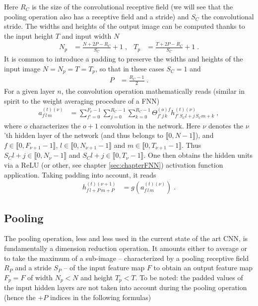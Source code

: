 Here $R_C$ is the size of the convolutional receptive field (we will see that the pooling operation also has a receptive field and a stride) and $S_C$ the convolutional stride. The widths and heights of the output image can be computed thanks to the input height $T$ and input width $N$
\begin{align}
N_p&=\frac{N+2P-R_C}{S_C}+1 \;,&
%
T_p&=\frac{T+2P-R_C}{S_C}+1\;.
\end{align}
It is common to introduce a padding to preserve the widths and heights of the input image $N=N_p=T=T_p$, so that in these cases $S_C=1$ and
\begin{align}
P&=\frac{R_C-1}{2}\;.
\end{align}
For a given layer $n$, the convolution operation mathematically reads (similar in spirit to the weight averaging procedure of a FNN)
\begin{align}
a_{f\,l\,m}^{(t)(\nu)}&=\sum^{F_\nu-1}_{f'=0}\sum^{R_C-1}_{j=0}\sum^{R_C-1}_{k=0}
%
\Theta^{(o)f}_{f'\,j\,k}h^{(t)(\nu)}_{f'\,S_Cl+j\,S_Cm+k}\;,
\end{align}
where $o$ characterizes the $o+1$ convolution in the network. Here $\nu$ denotes the $\nu$'th hidden layer of the network (and thus belongs to $\llbracket0,N-1 \rrbracket$), and $f\in\llbracket0,F_{\nu+1}-1\rrbracket$, $l\in\llbracket0,N_{\nu+1}-1 \rrbracket$ and $m\in\llbracket0,T_{\nu+1}-1 \rrbracket$. Thus $S_Cl+j\in\llbracket0,N_\nu-1 \rrbracket$ and $S_Cl+j\in\llbracket0,T_\nu-1 \rrbracket$. One then obtains the hidden units via a ReLU (or other, see chapter \ref{sec:chapterFNN}) activation function application. Taking padding into account, it reads
\begin{align}
h_{f\,l+P\,m+P}^{(t)(\nu+1)}&=g\left(a_{f\,l\,m}^{(t)(\nu)}\right)\;.
\end{align}


\subsection{Pooling}

The pooling operation, less and less used in the current state of the art CNN, is fundamentally a dimension reduction operation. It amounts either to average or to take the maximum of a sub-image -- characterized by a pooling receptive field $R_P$ and a stride $S_P$ -- of the input feature map $F$ to obtain an output feature map $F_p=F$ of width $N_p<N$ and height $T_p<T$. To be noted: the padded values of the input hidden layers are not taken into account during the pooling operation (hence the $+P$ indices in the following formulas)


